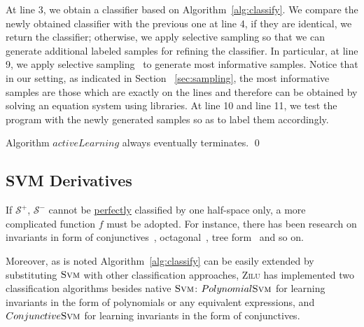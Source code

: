 At line 3, we obtain a classifier based on Algorithm~\ref{alg:classify}. 
We compare the newly obtained classifier with the previous one at line 4, if they are identical, we return the classifier; 
otherwise, we apply selective sampling so that we can generate additional labeled samples for refining the classifier. 
In particular, at line 9, we apply selective sampling~\cite{DBLP:conf/icml/SchohnC00} to generate most informative samples.
Notice that in our setting, as indicated in Section ~\ref{sec:sampling}, the most informative samples are those which are exactly on the lines 
and therefore can be obtained by solving an equation system using libraries. 
At line 10 and line 11, we test the program with the newly generated samples so as to label them accordingly.


\begin{proposition}
Algorithm $activeLearning$ always eventually terminates. \hfill \qed
\end{proposition}


\subsection{SVM Derivatives}
\label{subsec:svm:derivatives}
If $\mathcal{S}^+$, $\mathcal{S}^-$ cannot be \underline{perfectly} classified by one half-space only, 
a more complicated function $f$ must be adopted. 
For instance, there has been research on invariants in form of conjunctives~\cite{sharma2012interpolants}, 
octagonal~\cite{mine2006octagon}, tree form~\cite{krishna2015learning}\cite{garg2015learning} and so on.


Moreover, as is noted Algorithm~\ref{alg:classify} can be easily extended by substituting $\textsc{Svm}$ with other classification approaches,
\textsc{Zilu} has implemented two classification algorithms besides native $\textsc{Svm}$: 
$Polynomial \textsc{Svm}$ for learning invariants in the form of polynomials or any equivalent expressions,
and $Conjunctive \textsc{Svm}$ for learning invariants in the form of conjunctives.


